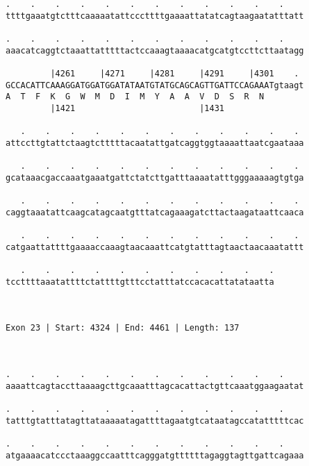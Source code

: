 \documentclass{article}
\begin{document}
\begin{Verbatim}
.    .    .    .    .    .    .    .    .    .    .    .    
ttttgaaatgtctttcaaaaatattcccttttgaaaattatatcagtaagaatatttatt
                                                            
.    .    .    .    .    .    .    .    .    .    .    .    
aaacatcaggtctaaattatttttactccaaagtaaaacatgcatgtccttcttaatagg
                                                            
         |4261     |4271     |4281     |4291     |4301    . 
GCCACATTCAAAGGATGGATGGATATAATGTATGCAGCAGTTGATTCCAGAAATgtaagt
A  T  F  K  G  W  M  D  I  M  Y  A  A  V  D  S  R  N        
         |1421                         |1431                
  
   .    .    .    .    .    .    .    .    .    .    .    . 
attccttgtattctaagtctttttacaatattgatcaggtggtaaaattaatcgaataaa
                                                            
   .    .    .    .    .    .    .    .    .    .    .    . 
gcataaacgaccaaatgaaatgattctatcttgatttaaaatatttgggaaaaagtgtga
                                                            
   .    .    .    .    .    .    .    .    .    .    .    . 
caggtaaatattcaagcatagcaatgtttatcagaaagatcttactaagataattcaaca
                                                            
   .    .    .    .    .    .    .    .    .    .    .    . 
catgaattattttgaaaaccaaagtaacaaattcatgtatttagtaactaacaaatattt
                                                            
   .    .    .    .    .    .    .    .    .    .    .
tccttttaaatattttctattttgtttcctatttatccacacattatataatta
                                                      
                                                      
 
Exon 23 | Start: 4324 | End: 4461 | Length: 137



.    .    .    .    .    .    .    .    .    .    .    .    
aaaattcagtaccttaaaagcttgcaaatttagcacattactgttcaaatggaagaatat
                                                            
.    .    .    .    .    .    .    .    .    .    .    .    
tatttgtatttatagttataaaaatagattttagaatgtcataatagccatatttttcac
                                                            
.    .    .    .    .    .    .    .    .    .    .    .    
atgaaaacatccctaaaggccaatttcagggatgttttttagaggtagttgattcagaaa
                                                            

\end{Verbatim}
\end{document}
